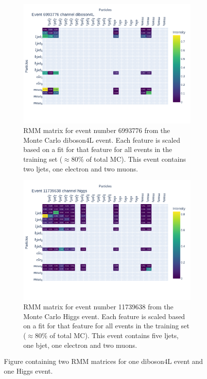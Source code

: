 \begin{figure}[H]
    \centering
    \begin{subfigure}{.8\textwidth}
        \includegraphics[width=\textwidth]{Figures/rmms/rmm_event_6993776_diboson4L.pdf}
        \caption{RMM matrix for event number 6993776 from the Monte Carlo diboson4L event. Each feature is scaled based on a fit for that feature for 
        all events in the training set ($\approx 80\%$ of total MC). This event contains two ljets, one electron and two muons.}
        \label{fig:rmm_zee_event}
    \end{subfigure}
    \hfill
    \begin{subfigure}{.8\textwidth}
        \includegraphics[width=\textwidth]{Figures/rmms/rmm_event_11739638_higgs.pdf}
        \caption{ RMM matrix for event number 11739638 from the Monte Carlo Higgs event. Each feature is scaled based on a fit for that feature for 
        all events in the training set ($\approx 80\%$ of total MC). This event contains five ljets, one bjet, one electron and two muons. }
        \label{fig:rmm_higgs_event}
    \end{subfigure}
    \hfill        
    \caption[Single event RMM plot]{Figure containing two RMM matrices for one diboson4L event and one Higgs event.}
    \label{fig:rmm_singular_events}
\end{figure}

